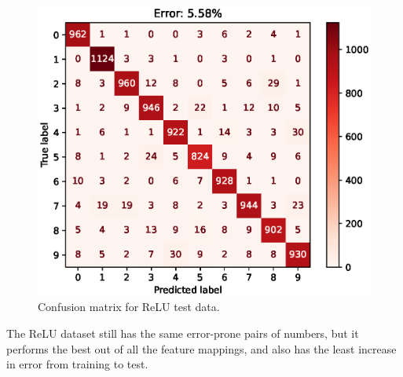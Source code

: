 \documentclass{article}
\begin{document}
\begin{figure}[h!]
\begin{minipage}{0.5\textwidth}
        \includegraphics[width=\textwidth]{images/one_vs_all_test_confusion_matrix_ReLU.eps}
        \caption{Confusion matrix for ReLU test data.}
    \end{minipage}
\end{figure}
The ReLU dataset still has the same error-prone pairs of numbers, but it performs the best out of all the feature mappings, and also has the least increase in error from training to test.

\FloatBarrier
\end{document}
